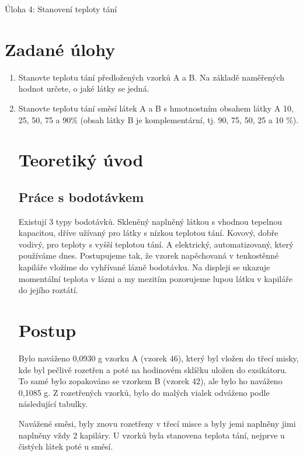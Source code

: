 \documentclass[13pt, a4paper, twoside]{article}
\begin{document}
\begin{center}
    \Huge
    Úloha 4: Stanovení teploty tání
\end{center}
\onehalfspacing \large
\section*{Zadané úlohy}
\begin{enumerate}
    \item Stanovte teplotu tání předložených vzorků A a B. Na základě naměřených hodnot určete,
    o jaké látky se jedná.
    \item    Stanovte teplotu tání směsí látek A a B s hmotnostním obsahem látky A 10, 25, 50, 75
    a 90\% (obsah látky B je komplementární, tj. 90, 75, 50, 25 a 10 \%).
     
\section*{Teoretiký úvod}
\subsection*{Práce s bodotávkem}
Existují 3 typy bodotávků. Skleněný naplněný látkou s vhodnou tepelnou kapacitou, dříve užívaný pro látky s nízkou teplotou tání. Kovový, dobře vodivý, pro teploty s vyšší teplotou tání. A elektrický, automatizovaný, který používáme dnes.
Postupujeme tak, že vzorek napěchovaná v tenkostěnné kapiláře vložíme do vyhřívané lázně bodotávku. Na displeji se ukazuje momentální teplota v lázni a my mezitím pozorujeme lupou látku v kapiláře do jejího roztátí.

\section*{Postup}
Bylo naváženo 0,0930 g vzorku A (vzorek 46), který byl vložen do třecí misky, kde byl pečlivě rozetřen a poté na hodinovém sklíčku uložen do exsikátoru. To samé bylo zopakováno se vzorkem B (vzorek 42), ale bylo ho naváženo 0,1085 g. Z rozetřených vzorků, bylo do malých vialek odváženo podle následující tabulky.


Navážené směsi, byly znovu rozetřeny v třecí misce a byly jemi naplněny jimi naplněny vždy 2 kapiláry. U vzorků byla stanovena teplota tání, nejprve u čistých látek poté u směsí.


\end{enumerate}
\end{document}
